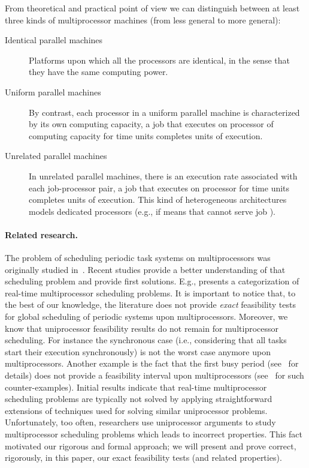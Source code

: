 \documentclass[a4paper,11pt]{article}
\begin{document}
From theoretical and practical point of view we can distinguish between at
least three kinds of multiprocessor machines (from less
general to more general):

\begin{description}
\item[Identical parallel machines] Platforms upon which
all the processors are identical, in the sense that they have the same
computing power.

\item[Uniform parallel machines] By contrast, each processor in a
uniform parallel machine is characterized by its own computing
capacity, a job that executes on processor  of computing capacity
 for  time units completes  units of execution.

\item[Unrelated parallel machines] In unrelated parallel
machines, there is an execution rate  associated with each
job-processor pair, a job  that executes on processor
 for  time units completes  units of execution. This kind of heterogeneous architectures models dedicated processors (e.g., if  means that  cannot serve job ).
\end{description}

\paragraph{Related research.} The problem of scheduling periodic task
systems on multiprocessors was originally studied
in~\cite{liu2}. Recent studies provide a better understanding of that
scheduling problem and provide first solutions. E.g., \cite{carpenter}
presents a categorization of real-time multiprocessor scheduling
problems. It is important to notice that, to the best of our
knowledge, the literature does not provide \emph{exact} feasibility
tests for global scheduling of periodic systems upon
multiprocessors. Moreover, we know that uniprocessor feasibility
results do not remain for multiprocessor scheduling. For instance the
synchronous case (i.e., considering that all tasks start their
execution synchronously) is not the worst case anymore upon
multiprocessors. Another example is the fact that the first busy
period (see~\cite{Lehoczky90} for details) does not provide a
feasibility interval upon multiprocessors (see~\cite{goossens4} for
such counter-examples). Initial results indicate that real-time
multiprocessor scheduling problems are typically not solved by
applying straightforward extensions of techniques used for solving
similar uniprocessor problems. Unfortunately, too often, researchers
use uniprocessor arguments to study multiprocessor scheduling problems
which leads to incorrect properties. This fact motivated our rigorous
and formal approach; we will present and prove correct, rigorously,
in this paper, our exact feasibility tests (and related properties).
\end{document}
